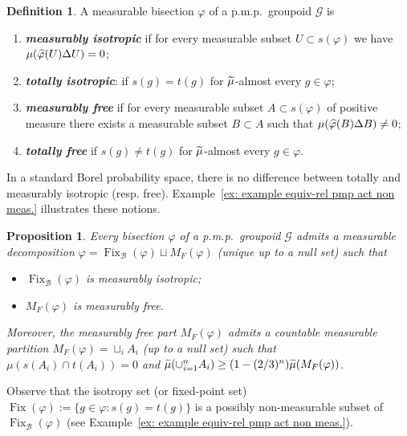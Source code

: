 \documentclass[10pt]{amsart}
\newtheorem{prop}[cdrthm]{Proposition}
\theoremstyle{definition}
\newtheorem{defi}[cdrthm]{Definition}
\newcommand{\defin}[1]{\textbf{\emph{#1}}}
\newcommand{\cg}{\mathcal{G}}
\newcommand{\rb}{\mathscr{B}}
\DeclareMathOperator{\Fix}{Fix}
\newcommand{\ph}{\varphi}
\newcommand{\pmp}{p.m.p.\ }
\let\oldtilde\tilde
\renewcommand*{\tilde}[1]{\mathchoice{\widetilde{#1}}{\widetilde{#1}}{\oldtilde{#1}}{\oldtilde{#1}}}
\let\oldhat\hat
\renewcommand*{\hat}[1]{\mathchoice{\widehat{#1}}{\widehat{#1}}{\oldhat{#1}}{\oldhat{#1}}}
\begin{document}
\begin{defi}\label{def: tot. vs meas isotrop, free}
A measurable bisection $\ph$ of a \pmp groupoid $\cg$ is
\begin{enumerate}
\item\label{defi2.11.1} \defin{measurably isotropic} if for every measurable subset $U\subset s(\ph)$ we have $\mu (\hat\ph(U)\Delta U)=0$;
\item \label{defi2.11.2} \defin{totally isotropic}: if $s(g)=t(g)$ for $\tilde\mu$-almost every $g\in {\ph}$;
\item \label{defi2.11.3} \defin{measurably free} if for every measurable subset $A\subset s(\ph)$ of positive measure there exists a measurable subset $B\subset A$ such that $\mu(\hat\ph(B)\Delta B)\not= 0$;
\item \label{defi2.11.4} \defin{totally free} if $s(g)\neq t(g)$ for $\tilde\mu$-almost every $g\in {\ph}$.
\end{enumerate}
\end{defi}

In a standard Borel probability space, there is no difference between totally and measurably isotropic (resp. free). Example~\ref{ex: example equiv-rel pmp act non meas.} illustrates these notions.

\begin{prop}\label{prop:manyinvo-gen}
Every bisection $\ph$ of a \pmp groupoid $\cg$ admits a measurable decomposition $\ph = \Fix_{\rb}(\ph)\sqcup M_F(\ph)$ (unique up to a null set) such that
\begin{itemize}
\item $\Fix_{\rb}(\ph)$ is measurably isotropic;
\item $M_F(\ph)$ is measurably free.
\end{itemize}

Moreover, the measurably free part $M_F(\ph)$ admits a countable measurable partition $M_F(\ph)=\sqcup_i A_i$ (up to a null set) such that $\mu(s(A_i)\cap t(A_i))=0$ and $\widetilde \mu(\cup_{i=1}^n A_i)\linebreak\geq (1-(2/3)^n) \widetilde \mu(M_F(\ph))$.
\end{prop}

Observe that the isotropy set (or fixed-point set) $\Fix(\ph):=\{g\in \ph: s(g)=t(g)\}$ is a possibly non-measurable subset of $ \Fix_{\rb}(\ph)$ (see Example~\ref{ex: example equiv-rel pmp act non meas.}).
\end{document}
